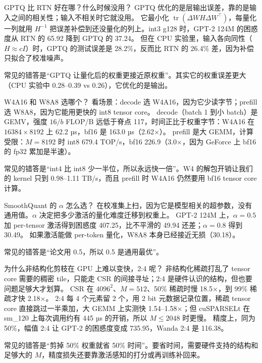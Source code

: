 \documentclass[11pt,a4paper]{ctexart}
\begin{document}
\begin{iqbox}{GPTQ 比 RTN 好在哪？什么时候没用？}
GPTQ 优化的是层输出误差，靠的是输入之间的相关性；输入不相关时它就没用。
它最小化 $\operatorname{tr}(\Delta WH\Delta W^\top)$，每量化一列就用 $H^{-1}$ 把误差补偿到还没量化的列上。int3 g128 时，GPT-2 124M 的困惑度从 RTN 的 65.92 降到 GPTQ 的 37.24。
但在 CPU 实验里，输入各向同性（$H\approx cI$）时，GPTQ 的测试误差是 28.2\%，反而比 RTN 的 26.4\% 差，因为补偿只拟合了校准噪声。

常见的错答是“GPTQ 让量化后的权重更接近原权重”。其实它的权重误差更大（CPU 实验中 0.28--0.39 vs 0.26），它优化的是输出。
\end{iqbox}

\begin{iqbox}{W4A16 和 W8A8 选哪个？}
看场景：decode 选 W4A16，因为它少读字节；prefill 选 W8A8，因为它能用更快的 int8 tensor core。
decode（batch 1 到小 batch）是 GEMV，强度 $16/b$ FLOP/B 远低于脊点 117，时间正比于权重字节：W4A16 在 $16384\times8192$ 上 62.2 µs，bf16 是 163.0 µs（2.62$\times$）。
prefill 是大 GEMM，计算受限：$M{=}8192$ 时 int8 679.4 TOP/s，bf16 226.9（3.0$\times$，因为 GeForce 上 bf16 的 fp32 累加是半速）。

常见的错答是“int4 比 int8 少一半位，所以永远快一倍”。W4 的解包开销让我们的 kernel 只到 0.98--1.11 TB/s，而且 prefill 时 W4A16 仍然要用 bf16 tensor core 计算。
\end{iqbox}

\begin{iqbox}{SmoothQuant 的 $\alpha$ 怎么选？}
在校准集上扫，因为它是模型相关的超参数，没有通用值。$\alpha$ 决定把多少激活的量化难度迁移到权重上。
GPT-2 124M 上，$\alpha{=}0.5$ 加 per-tensor 激活得到困惑度 407.25，比不平滑的 49.94 还差；$\alpha{=}0.8$ 得到 30.49。
如果激活能做 per-token 量化，W8A8 本身已经接近无损（30.18）。

常见的错答是“论文用 0.5，所以 0.5 是通用最优”。
\end{iqbox}

\begin{iqbox}{为什么非结构化剪枝在 GPU 上难以变快，2:4 呢？}
非结构化稀疏打乱了 tensor core 需要的稠密 tile，只能走 CSR 的间接寻址；2:4 是硬件认识的结构，但也要问题足够大才划算。
CSR 在 $4096^2$、$M{=}512$、50\% 稀疏时慢 18.5$\times$，到 99\% 稀疏才快 2.18$\times$。
2:4 每 4 个元素留 2 个，用 2 bit 元数据记录位置，稀疏 tensor core 直接跳过一半乘加，大 GEMM 上实测快 1.54--1.58$\times$；但 cuSPARSELt 在 sm\_120 上每次调用约有 445 µs 的开销，所以 $M\le2048$ 时更慢。
精度上，同为 50\%，幅值 2:4 让 GPT-2 的困惑度变成 735.95，Wanda 2:4 是 116.38。

常见的错答是“剪掉 50\% 权重就省 50\% 时间”。要省时间，需要硬件支持的结构和足够大的 $M$，精度损失还要靠激活感知的打分或再训练补回来。
\end{iqbox}
\end{document}

